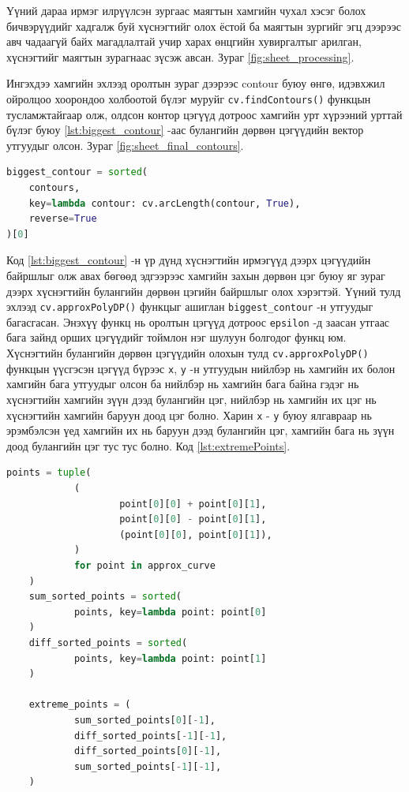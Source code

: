 Үүний дараа ирмэг илрүүлсэн зургаас маягтын хамгийн чухал хэсэг болох бичвэрүүдийг хадгалж буй хүснэгтийг олох ёстой ба маягтын зургийг эгц дээрээс авч чадаагүй байх магадлалтай учир харах өнцгийн хувиргалтыг арилган, хүснэгтийг маягтын зурагнаас зүсэж авсан. Зураг \ref{fig:sheet_processing}.

Ингэхдээ хамгийн эхлээд оролтын зураг дээрээс contour буюу өнгө, идэвхжил ойролцоо хоорондоо холбоотой бүлэг муруйг \texttt{cv.findContours()} функцын тусламжтайгаар олж, олдсон контор цэгүүд дотроос хамгийн урт хүрээний урттай бүлэг буюу \ref{lst:biggest_contour} -аас булангийн дөрвөн цэгүүдийн вектор утгуудыг олсон. Зураг \ref{fig:sheet_final_contours}.

\begin{lstlisting}[caption={Хамгийн урт контор цэгүүд буюу энэ тохиолдолд бичвэр хадгалж буй хүснэгтийн ирмэг дээрх цэгүүд}, label={lst:biggest_contour}, language=Python]
biggest_contour = sorted(
	contours, 
	key=lambda contour: cv.arcLength(contour, True), 
	reverse=True
)[0]
\end{lstlisting}

Код \ref{lst:biggest_contour} -н үр дүнд хүснэгтийн ирмэгүүд дээрх цэгүүдийн байршлыг олж авах бөгөөд эдгээрээс хамгийн захын дөрвөн цэг буюу яг зураг дээрх хүснэгтийн булангийн дөрвөн цэгийн байршлыг олох хэрэгтэй. Үүний тулд эхлээд \texttt{cv.approxPolyDP()} функцыг ашиглан \texttt{biggest\_contour} -н утгуудыг багасгасан. Энэхүү функц нь оролтын цэгүүд дотроос \texttt{epsilon} -д заасан утгаас бага зайнд орших цэгүүдийг тоймлон нэг шулуун болгодог функц юм. Хүснэгтийн булангийн дөрвөн цэгүүдийн олохын тулд \texttt{cv.approxPolyDP()} функцын үүсгэсэн цэгүүд бүрээс \texttt{x}, \texttt{y} -н утгуудын нийлбэр нь хамгийн их болон хамгийн бага утгуудыг олсон ба нийлбэр нь хамгийн бага байна гэдэг нь хүснэгтийн хамгийн зүүн дээд булангийн цэг, нийлбэр нь хамгийн их цэг нь хүснэгтийн хамгийн баруун доод цэг болно. Харин \texttt{x} - \texttt{y} буюу ялгавраар нь эрэмбэлсэн үед хамгийн их нь баруун дээд булангийн цэг, хамгийн бага нь зүүн доод булангийн цэг тус тус болно. Код \ref{lst:extremePoints}.

\begin{lstlisting}[caption={Тоймлосон цэгүүдээс хүснэгтийн булангийн цэгүүдийг олох}, label={lst:extremePoints}, language=Python]
	points = tuple(
			(
					point[0][0] + point[0][1],
					point[0][0] - point[0][1],
					(point[0][0], point[0][1]),
			)
			for point in approx_curve
	)
	sum_sorted_points = sorted(
			points, key=lambda point: point[0]
	)
	diff_sorted_points = sorted(
			points, key=lambda point: point[1]
	)
	
	extreme_points = (
			sum_sorted_points[0][-1],
			diff_sorted_points[-1][-1],
			diff_sorted_points[0][-1],
			sum_sorted_points[-1][-1],
	)
	\end{lstlisting}

